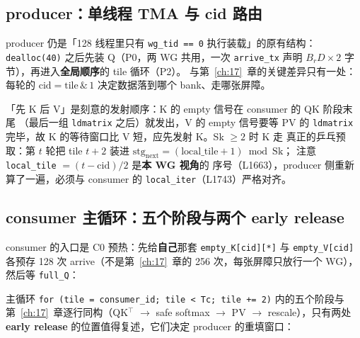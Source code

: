 \subsection{producer：单线程 TMA 与 cid 路由}

producer 仍是「128 线程里只有 \texttt{wg\_tid == 0} 执行装载」的原有结构：
\texttt{dealloc(40)} 之后先装 Q（P0，两 WG 共用，一次 \texttt{arrive\_tx}
声明 $B_r D \times 2$ 字节），再进入\textbf{全局顺序}的 tile 循环（P2）。
与第~\ref{ch:17}~章的关键差异只有一处：每轮的
$\mathrm{cid} = \mathrm{tile}\,\&\,1$ 决定数据落到哪个 bank、走哪张屏障。





「先 K 后 V」是刻意的发射顺序：K 的 empty 信号在 consumer 的 QK 阶段末尾
（最后一组 \texttt{ldmatrix} 之后）就发出，V 的 empty 信号要等 PV 的
\texttt{ldmatrix} 完毕，故 K 的等待窗口比 V 短，应先发射 K。Sk $\ge 2$ 时 K 走
真正的乒乓预取：第 $t$ 轮把 tile $t+2$ 装进
$\mathrm{stg}_{\mathrm{next}} = (\mathrm{local\_tile}+1) \bmod \mathrm{Sk}$；
注意 \texttt{local\_tile} $= (t - \mathrm{cid})/2$ 是\textbf{本 WG 视角}的
序号（L1663），producer 侧重新算了一遍，必须与 consumer 的
\texttt{local\_iter}（L1743）严格对齐。

\subsection{consumer 主循环：五个阶段与两个 early release}

consumer 的入口是 C0 预热：先给\textbf{自己}那套 \texttt{empty\_\allowbreak{}K[cid][*]}
与 \texttt{empty\_\allowbreak{}V[cid]} 各预存 128 次 arrive（不是第~\ref{ch:17}~章的 256
次，每张屏障只放行一个 WG），然后等 \texttt{full\_Q}：



主循环 \texttt{for \allowbreak{}(tile =\allowbreak{} consumer\_\allowbreak{}id; tile \allowbreak{}< Tc; tile +=\allowbreak{} 2)} 内的五个阶段与
第~\ref{ch:17}~章逐行同构（QK$^\top$ $\to$ safe softmax $\to$ PV $\to$
rescale），只有两处 \textbf{early release} 的位置值得复述，它们决定 producer
的重填窗口：

